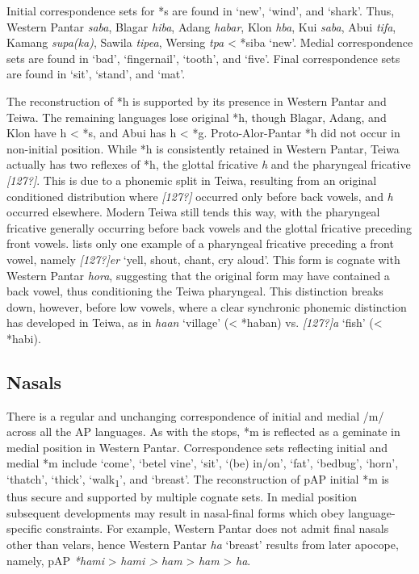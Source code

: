 Initial correspondence sets for *s are found in `new', `wind', and `shark'. Thus, Western Pantar \textit{sab{\textlengthmark}a}, Blagar\textit{ hiba}, Adang \textit{habar}, Klon \textit{h{\textschwa}ba}, Kui \textit{saba}, Abui \textit{tifa}, Kamang \textit{supa(ka)}, Sawila \textit{tipea}, Wersing \textit{t{\textschwa}pa }{\textless} *siba `new'. Medial correspondence sets are found in `bad', `fingernail', `tooth', and `five'. Final correspondence sets are found in `sit', `stand', and `mat'.

The reconstruction of *h is supported by its presence in Western Pantar and Teiwa. The remaining languages lose original *h, though Blagar, Adang, and Klon have h {\textless} *s, and Abui has h {\textless} *g. Proto-Alor-Pantar *h did not occur in non-initial position. While *h is consistently retained in Western Pantar, Teiwa actually has two reflexes of *h, the glottal fricative \textit{h} and the pharyngeal fricative \textit{[127?]}. This is due to a phonemic split in Teiwa, resulting from an original conditioned distribution where \textit{[127?]} occurred only before back vowels, and \textit{h} occurred elsewhere. Modern Teiwa still tends this way, with the pharyngeal fricative generally occurring before back vowels and the glottal fricative preceding front vowels. \citet{Klamer2010} lists only one example of a pharyngeal fricative preceding a front vowel, namely \textit{[127?]er} `yell, shout, chant, cry aloud'. This form is cognate with Western Pantar \textit{hora{\ng}}, suggesting that the original
form may have contained a back vowel, thus conditioning the Teiwa pharyngeal. This distinction breaks down, however, before low vowels, where a clear synchronic phonemic distinction has developed in Teiwa, as in \textit{ha{\textphi}an }`village' ({\textless} *haban) vs. \textit{[127?]a{\textphi} }`fish' ({\textless} *habi).

\subsection{ Nasals}
There is a regular and unchanging correspondence of initial and medial /m/ across all the AP languages. As with the stops, *m is reflected as a geminate in medial position in Western Pantar. Correspondence sets reflecting initial and medial *m include `come', `betel vine', `sit', `(be) in/on', `fat', `bedbug', `horn', `thatch', `thick', `walk\textsubscript{1}', and `breast'. The reconstruction of pAP initial *m is thus secure and supported by multiple cognate sets. In medial position subsequent developments may result in nasal-final forms which obey language-specific constraints. For example, Western Pantar does not admit final nasals other than velars, hence Western Pantar \textit{ha{\ng} }`breast' results from later apocope, namely, pAP \textit{*hami} {\textgreater} \textit{ham{\textlengthmark}i {\textgreater}} \textit{ham{\textlengthmark}} {\textgreater} \textit{ham} {\textgreater} \textit{ha}\textit{{\ng}}.

